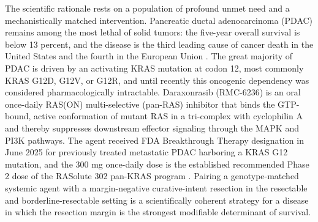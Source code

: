 The scientific rationale rests on a population of profound unmet need and a
mechanistically matched intervention. Pancreatic ductal adenocarcinoma (PDAC)
remains among the most lethal of solid tumors: the five-year overall survival is
below 13 percent, and the disease is the third leading cause of cancer death in the
United States and the fourth in the European Union \cite{pdac060s2030}. The great
majority of PDAC is driven by an activating KRAS mutation at codon 12, most commonly
KRAS G12D, G12V, or G12R, and until recently this oncogenic dependency was
considered pharmacologically intractable. Daraxonrasib (RMC-6236) is an oral
once-daily RAS(ON) multi-selective (pan-RAS) inhibitor that binds the GTP-bound,
active conformation of mutant RAS in a tri-complex with cyclophilin A and thereby
suppresses downstream effector signaling through the MAPK and PI3K pathways. The
agent received FDA Breakthrough Therapy designation in June 2025 for previously
treated metastatic PDAC harboring a KRAS G12 mutation, and the 300 mg once-daily
dose is the established recommended Phase 2 dose of the RASolute 302 pan-KRAS
program \cite{daraxwhipple,oncotrialllm}. Pairing a genotype-matched systemic agent
with a margin-negative curative-intent resection in the resectable and
borderline-resectable setting is a scientifically coherent strategy for a disease in
which the resection margin is the strongest modifiable determinant of survival.

